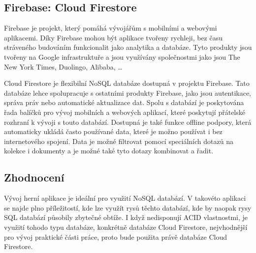 \subsection{Firebase: Cloud Firestore}

Firebase je projekt,
který pomáhá vývojářům s mobilními a webovými aplikacemi.
Díky Firebase mohou být aplikace tvořeny rychleji,
bez času stráveného budováním funkcionalit jako analytika a databáze.
Tyto produkty jsou tvořeny na Google infrastruktuře
a jsou využívány společnostmi jako jsou The New York Times,
Duolingo, Alibaba, \dots{}
\cite{firebase}

Cloud Firestore je flexibilní NoSQL databáze dostupná v projektu Firebase.
Tato databáze lehce spolupracuje s ostatními produkty Firebase,
jako jsou autentikace, správa práv nebo automatické aktualizace dat.
Spolu s databází je poskytována řada balíčků pro vývoj mobilních a webových
aplikací,
které poskytují přátelské rozhraní k vývoji s touto databází.
Dostupná je také funkce offline podpory,
která automaticky ukládá často používané data,
které je možno používat i bez internetového spojení.
Data je možné filtrovat pomocí speciálních dotazů na kolekce i dokumenty
a je možné také tyto dotazy kombinovat a řadit.
\cite{cloud_firestore}

\subsection{Zhodnocení}

Vývoj herní aplikace je ideální pro využití NoSQL databází.
V takovéto aplikaci se najde plno příležitostí,
kde lze využít rysů těchto databází,
kde by naopak rysy SQL databází působily zbytečné obtíže.
I když nedisponují ACID vlastnostmi,
je využití tohodo typu databáze,
konkrétně databáze Cloud Firestore,
nejvhodnější pro vývoj praktické části práce,
proto bude použita právě databáze Cloud Firestore.
